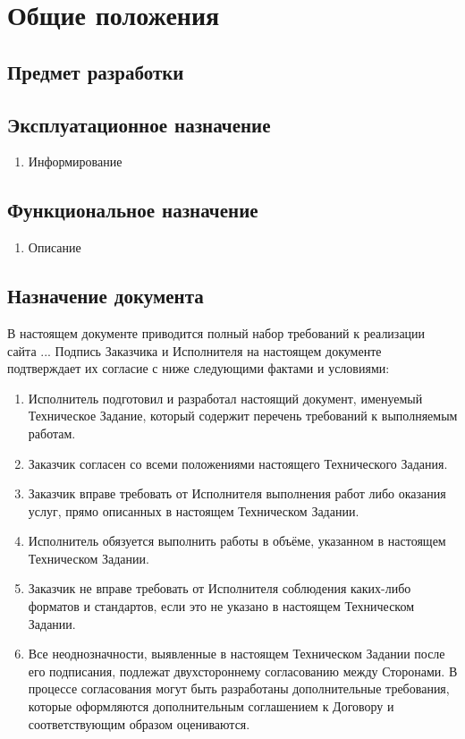 \section{Общие положения}

\subsection{Предмет разработки}

\subsection{Эксплуатационное назначение}

\begin{enumerate}
  \item Информирование
\end{enumerate}

\subsection{Функциональное назначение}
\begin{enumerate}
  \item Описание
\end{enumerate}

\subsection{Назначение документа}
В настоящем документе приводится полный набор требований к реализации сайта ...
Подпись Заказчика и Исполнителя на настоящем документе подтверждает их согласие с ниже следующими фактами и условиями:
\begin{enumerate}
  \item Исполнитель подготовил и разработал настоящий документ, именуемый Техническое Задание, который содержит перечень требований к выполняемым работам.
  \item Заказчик согласен со всеми положениями настоящего Технического Задания.
  \item Заказчик вправе требовать от Исполнителя выполнения работ либо оказания услуг, прямо описанных в настоящем Техническом Задании.
  \item Исполнитель обязуется выполнить работы в объёме, указанном в настоящем Техническом Задании.
  \item Заказчик не вправе требовать от Исполнителя соблюдения каких-либо форматов и стандартов, если это не указано в настоящем Техническом Задании.
  \item Все неоднозначности, выявленные в настоящем Техническом Задании после его подписания, подлежат двухстороннему согласованию между Сторонами. В процессе согласования могут быть разработаны дополнительные требования, которые оформляются дополнительным соглашением к Договору и соответствующим образом оцениваются.
\end{enumerate}
